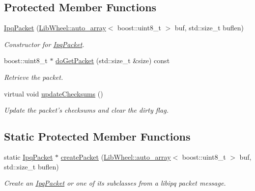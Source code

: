 \subsection*{\-Protected \-Member \-Functions}
\begin{DoxyCompactItemize}
\item 
\hyperlink{classIPQ_1_1IpqPacket_a9ebf127442e021c3b25c8efa4711f531}{\-Ipq\-Packet} (\hyperlink{classLibWheel_1_1auto__array}{\-Lib\-Wheel\-::auto\-\_\-array}$<$ boost\-::uint8\-\_\-t $>$ buf, std\-::size\-\_\-t buflen)
\begin{DoxyCompactList}\small\item\em \-Constructor for \hyperlink{classIPQ_1_1IpqPacket}{\-Ipq\-Packet}. \end{DoxyCompactList}\item 
boost\-::uint8\-\_\-t $\ast$ \hyperlink{classIPQ_1_1IpqPacket_a7b8f489a9cec36058eaee43f6566a999}{do\-Get\-Packet} (std\-::size\-\_\-t \&size) const 
\begin{DoxyCompactList}\small\item\em \-Retrieve the packet. \end{DoxyCompactList}\item 
virtual void \hyperlink{classIPQ_1_1IpqPacket_a6e9ce8b7a24f8e82a82a7bc3859e9d45}{update\-Checksums} ()
\begin{DoxyCompactList}\small\item\em \-Update the packet's checksums and clear the dirty flag. \end{DoxyCompactList}\end{DoxyCompactItemize}
\subsection*{\-Static \-Protected \-Member \-Functions}
\begin{DoxyCompactItemize}
\item 
static \hyperlink{classIPQ_1_1IpqPacket}{\-Ipq\-Packet} $\ast$ \hyperlink{classIPQ_1_1IpqPacket_adf6099052730113814e9fe7312ec7b8c}{create\-Packet} (\hyperlink{classLibWheel_1_1auto__array}{\-Lib\-Wheel\-::auto\-\_\-array}$<$ boost\-::uint8\-\_\-t $>$ buf, std\-::size\-\_\-t buflen)
\begin{DoxyCompactList}\small\item\em \-Create an \hyperlink{classIPQ_1_1IpqPacket}{\-Ipq\-Packet} or one of its subclasses from a libipq packet message. \end{DoxyCompactList}\end{DoxyCompactItemize}
